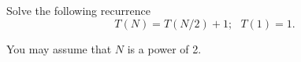 Solve the following recurrence
\[
T(N)= T(N/2)+1; \  \  \    T(1)=1.
\]

\noindent  You may assume that $N$ is a power of  2.
